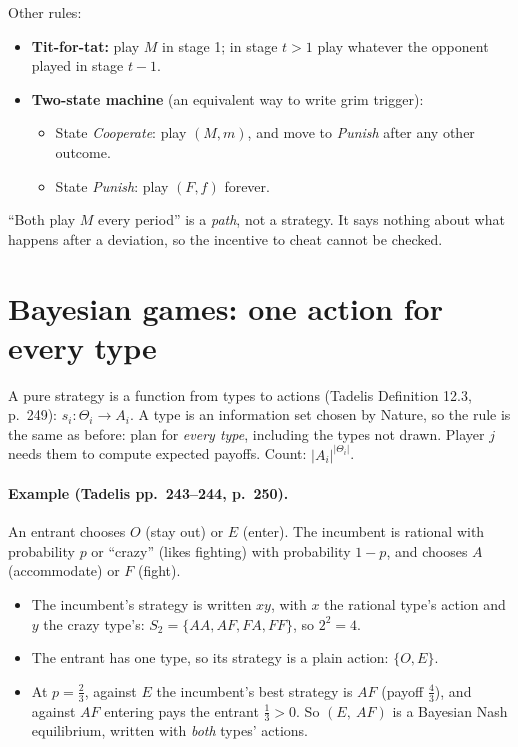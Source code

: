 \documentclass[11pt,a4paper]{article}
\begin{document}
\noindent Other rules:
\begin{itemize}
\item \textbf{Tit-for-tat:} play $M$ in stage 1; in stage $t>1$ play whatever the opponent played in
stage $t-1$.
\item \textbf{Two-state machine} (an equivalent way to write grim trigger):
\begin{itemize}
\item State \emph{Cooperate}: play $(M,m)$, and move to \emph{Punish} after any other outcome.
\item State \emph{Punish}: play $(F,f)$ forever.
\end{itemize}
\end{itemize}

\begin{trap}
``Both play $M$ every period'' is a \emph{path}, not a strategy. It says nothing about what happens
after a deviation, so the incentive to cheat cannot be checked.
\end{trap}

\section{Bayesian games: one action for every type}

A pure strategy is a function from types to actions (Tadelis Definition 12.3, p.~249):
$s_i:\Theta_i\to A_i$. A type is an information set chosen by Nature, so the rule is the same as
before: plan for \emph{every type}, including the types not drawn. Player $j$ needs them to
compute expected payoffs. Count: $|A_i|^{|\Theta_i|}$.

\paragraph{Example (Tadelis pp.~243--244, p.~250).} An entrant chooses $O$ (stay out) or $E$
(enter). The incumbent is rational with probability $p$ or ``crazy'' (likes fighting) with
probability $1-p$, and chooses $A$ (accommodate) or $F$ (fight).
\begin{itemize}
\item The incumbent's strategy is written $xy$, with $x$ the rational type's action and $y$ the
crazy type's: $S_2=\{AA,AF,FA,FF\}$, so $2^2=4$.
\item The entrant has one type, so its strategy is a plain action: $\{O,E\}$.
\item At $p=\tfrac23$, against $E$ the incumbent's best strategy is $AF$ (payoff $\tfrac43$), and
against $AF$ entering pays the entrant $\tfrac13>0$. So $(E,\ AF)$ is a Bayesian Nash equilibrium,
written with \emph{both} types' actions.
\end{itemize}
\end{document}
